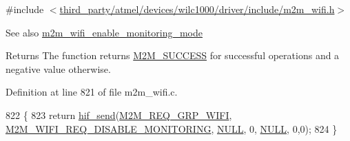 {\ttfamily \#include $<$\hyperlink{m2m__wifi_8h}{third\+\_\+party/atmel/devices/wilc1000/driver/include/m2m\+\_\+wifi.\+h}$>$}

\begin{DoxySeeAlso}{See also}
\hyperlink{group__WifiEnableMonitorModeFn_gac208f9fc4c1ac93d3fc3e8a81c3c2223}{m2m\+\_\+wifi\+\_\+enable\+\_\+monitoring\+\_\+mode} 
\end{DoxySeeAlso}
\begin{DoxyReturn}{Returns}
The function returns \hyperlink{nm__common_8h_a9ef27ba27aafdd1aa3a79d3ba2c36b8f}{M2\+M\+\_\+\+S\+U\+C\+C\+E\+SS} for successful operations and a negative value otherwise. 
\end{DoxyReturn}


Definition at line 821 of file m2m\+\_\+wifi.\+c.


\begin{DoxyCode}
822 \{
823     \textcolor{keywordflow}{return} \hyperlink{m2m__hif_8c_a13ba8ad11b2ac39516ca787386d16ce0}{hif\_send}(\hyperlink{nm__common_8h_a9ab02eb1aea02a75c3f5aade4eef1276aeb9a7d57324ba4b8a6c2a5f46dd499c2}{M2M\_REQ\_GRP\_WIFI}, 
      \hyperlink{group__WlanEnums_gga064de09dec1d5e88ed8d075fa40f57dead40d5ccf712ac57b8d94157f1f92bc08}{M2M\_WIFI\_REQ\_DISABLE\_MONITORING}, \hyperlink{group__BSPDefine_ga070d2ce7b6bb7e5c05602aa8c308d0c4}{NULL}, 0, 
      \hyperlink{group__BSPDefine_ga070d2ce7b6bb7e5c05602aa8c308d0c4}{NULL}, 0,0);
824 \}
\end{DoxyCode}

